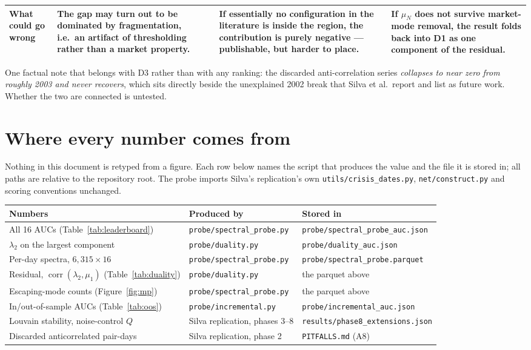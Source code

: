 \documentclass[11pt,a4paper]{article}
\newcommand{\Q}{Q}
\begin{document}
\begin{table}[t]
\begin{tabular}{@{}p{22mm}p{40mm}p{40mm}p{40mm}@{}}
\textbf{What could go wrong}
& The gap may turn out to be dominated by fragmentation, i.e.\ an artifact of
  thresholding rather than a market property.
& If essentially no configuration in the literature is inside the region, the
  contribution is purely negative --- publishable, but harder to place.
& If $\mu_N$ does not survive market-mode removal, the result folds back into
  D1 as one component of the residual. \\
\bottomrule
\end{tabular}
\end{table}

One factual note that belongs with D3 rather than with any ranking: the
discarded anti-correlation series \emph{collapses to near zero from roughly
2003 and never recovers}, which sits directly beside the unexplained 2002 break
that Silva et al.\ report and list as future work. Whether the two are connected
is untested.

\appendix
\section{Where every number comes from}

Nothing in this document is retyped from a figure. Each row below names the
script that produces the value and the file it is stored in; all paths are
relative to the repository root. The probe imports Silva's replication's own
\texttt{utils/crisis\_dates.py}, \texttt{net/construct.py} and scoring
conventions unchanged.

\begin{center}
\small
\begin{tabular}{@{}lll@{}}
\toprule
\textbf{Numbers} & \textbf{Produced by} & \textbf{Stored in} \\
\midrule
All 16 AUCs (Table~\ref{tab:leaderboard}) & \texttt{probe/spectral\_probe.py} & \texttt{probe/spectral\_probe\_auc.json} \\
$\lambda_2$ on the largest component & \texttt{probe/duality.py} & \texttt{probe/duality\_auc.json} \\
Per-day spectra, $6{,}315\times16$ & \texttt{probe/spectral\_probe.py} & \texttt{probe/spectral\_probe.parquet} \\
Residual, $\operatorname{corr}(\lambda_2,\mu_1)$ (Table~\ref{tab:duality}) & \texttt{probe/duality.py} & the parquet above \\
Escaping-mode counts (Figure~\ref{fig:mp}) & \texttt{probe/spectral\_probe.py} & the parquet above \\
In/out-of-sample AUCs (Table~\ref{tab:oos}) & \texttt{probe/incremental.py} & \texttt{probe/incremental\_auc.json} \\
Louvain stability, noise-control $\Q$ & Silva replication, phases 3--8 & \texttt{results/phase8\_extensions.json} \\
Discarded anticorrelated pair-days & Silva replication, phase 2 & \texttt{PITFALLS.md} (A8) \\
\bottomrule
\end{tabular}
\end{center}
\end{document}
